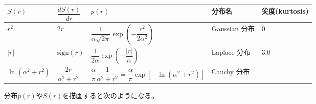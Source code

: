 \documentclass[letterpaper,10pt,english]{sphinxmanual}
\begin{document}
\begin{savenotes}\sphinxattablestart
\centering
\begin{tabulary}{\linewidth}[t]{|T|T|T|T|T|}
\hline
\sphinxstyletheadfamily 
\(S(r)\)
&\sphinxstyletheadfamily 
\(\dfrac{dS(r)}{dr}\)
&\sphinxstyletheadfamily 
\(p(r)\)
&\sphinxstyletheadfamily 
分布名
&\sphinxstyletheadfamily 
尖度(kurtosis)
\\
\hline
\(r^2\)
&
\(2r\)
&
\(\dfrac{1}{\alpha \sqrt{2\pi}}\exp\left(-\dfrac{r^2}{2\alpha^2}\right)\)
&
Gaussian 分布
&
0
\\
\hline
\(\vert r\vert\)
&
\(\text{sign}(r)\)
&
\(\dfrac{1}{2\alpha}\exp\left(-\dfrac{\vert r\vert}{\alpha}\right)\)
&
Laplace 分布
&
3.0
\\
\hline
\(\ln (\alpha^2+r^2)\)
&
\(\dfrac{2r}{\alpha^2+r^2}\)
&
\(\dfrac{\alpha}{\pi}\dfrac{1}{\alpha^2+r^2}=\dfrac{\alpha}{\pi}\exp[-\ln (\alpha^2+r^2)]\)
&
Cauchy 分布
&
\sphinxhyphen{}
\\
\hline
\end{tabulary}
\par
\sphinxattableend\end{savenotes}

分布\(p(r)\)や\(S(r)\)を描画すると次のようになる。
\end{document}
